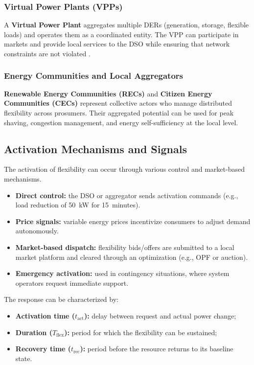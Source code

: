 \documentclass[11pt]{article}
\begin{document}
	\subsubsection*{Virtual Power Plants (VPPs)}
	A \textbf{Virtual Power Plant} aggregates multiple DERs (generation, storage, flexible loads) and operates them as a coordinated entity.  
	The VPP can participate in markets and provide local services to the DSO while ensuring that network constraints are not violated \cite{mohandes2021vpp}.
	
	\subsubsection*{Energy Communities and Local Aggregators}
	\textbf{Renewable Energy Communities (RECs)} and \textbf{Citizen Energy Communities (CECs)} represent collective actors who manage distributed flexibility across prosumers.  
	Their aggregated potential can be used for peak shaving, congestion management, and energy self-sufficiency at the local level.
	
	\subsection{Activation Mechanisms and Signals}
	
	The activation of flexibility can occur through various control and market-based mechanisms.
	
	\begin{itemize}
		\item \textbf{Direct control:} the DSO or aggregator sends activation commands (e.g., load reduction of 50~kW for 15~minutes).
		\item \textbf{Price signals:} variable energy prices incentivize consumers to adjust demand autonomously.
		\item \textbf{Market-based dispatch:} flexibility bids/offers are submitted to a local market platform and cleared through an optimization (e.g., OPF or auction).
		\item \textbf{Emergency activation:} used in contingency situations, where system operators request immediate support.
	\end{itemize}
	
	The response can be characterized by:
	\begin{itemize}
		\item \textbf{Activation time ($t_\text{act}$):} delay between request and actual power change;
		\item \textbf{Duration ($T_\text{flex}$):} period for which the flexibility can be sustained;
		\item \textbf{Recovery time ($t_\text{rec}$):} period before the resource returns to its baseline state.
	\end{itemize}
	
\end{document}
